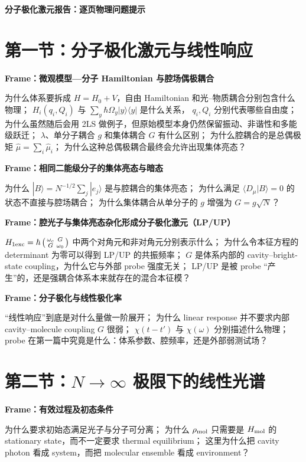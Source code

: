 \documentclass[11pt]{ctexart}
\newcommand{\framecue}[1]{%
  \par\smallskip
  \noindent\textbf{#1}\quad
}
\begin{document}
\begin{center}
  {\Large\bfseries 分子极化激元报告：逐页物理问题提示}
\end{center}

\section*{第一节：分子极化激元与线性响应}

\framecue{Frame：微观模型---分子 Hamiltonian 与腔场偶极耦合}
为什么体系要拆成 \(H=H_0+V\)，自由 Hamiltonian 和光--物质耦合分别包含什么物理；
\(H_i(q_i,Q_i)\) 与 \(\sum_y\hbar\Omega_y|y\rangle\langle y|\) 是什么关系，
\(q_i,Q_i\) 分别代表哪些自由度；
为什么虽然随后会用 2LS 做例子，但原始模型本身仍然保留振动、非谐性和多能级跃迁；
\(\lambda\)、单分子耦合 \(g\) 和集体耦合 \(G\) 有什么区别；
为什么腔耦合的是总偶极矩 \(\hat\mu=\sum_i\hat\mu_i\)；
为什么这种总偶极耦合最终会允许出现集体亮态？

\framecue{Frame：相同二能级分子的集体亮态与暗态}
为什么 \(|B\rangle=N^{-1/2}\sum_j|e_j\rangle\) 是与腔耦合的集体亮态；
为什么满足 \(\langle D_\mu|B\rangle=0\) 的状态不直接与腔场耦合；
为什么集体耦合从单分子的 \(g\) 增强为 \(G=g\sqrt N\)？

\framecue{Frame：腔光子与集体亮态杂化形成分子极化激元（LP/UP）}
\(H_{\rm 1exc}=\hbar\left(\begin{smallmatrix}\omega_c&G\\G&\omega_0\end{smallmatrix}\right)\)
中两个对角元和非对角元分别表示什么；
为什么令本征方程的 determinant 为零可以得到 LP/UP 的共振频率；
\(G\) 是体系内部的 cavity--bright-state coupling，为什么它与外部 probe 强度无关；
LP/UP 是被 probe ``产生''的，还是强耦合体系本来就存在的混合本征模？

\framecue{Frame：分子极化与线性极化率}
``线性响应''到底是对什么量做一阶展开；
为什么 linear response 并不要求内部 cavity--molecule coupling \(G\) 很弱；
\(\chi(t-t')\) 与 \(\chi(\omega)\) 分别描述什么物理；
probe 在第一篇中究竟是什么：体系参数、腔频率，还是外部弱测试场？

\section*{第二节：\(N\rightarrow\infty\) 极限下的线性光谱}

\framecue{Frame：有效过程及初态条件}
为什么要求初始态满足光子与分子可分离；
为什么 \(\rho_{\rm mol}\) 只需要是 \(H_{\rm mol}\) 的 stationary state，而不一定要求 thermal equilibrium；
这里为什么把 cavity photon 看成 system，而把 molecular ensemble 看成 environment？
\end{document}
